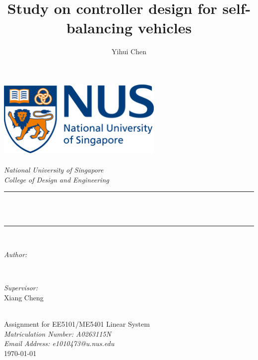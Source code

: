 \documentclass[hyperref]{article}
\title{Study on controller design for self-balancing vehicles}
\author{\textup{Yihui Chen}}
\theoremstyle{nonumberplain}
\begin{document}
	\begin{titlepage}
		\center
		\newcommand{\HRule}{\rule{\linewidth}{0.5mm}}
		\includegraphics[width=8cm]{logo.png}\\[1cm] 
		\quad\\[1.5cm]
		\textsl{\Large National University of Singapore}\\[0.5cm] 
		\textsl{\large College of Design and Engineering}\\[0.5cm]
		\makeatletter
		\HRule \\[0.4cm]
		{ \huge \bfseries \@title}\\[0.4cm] 
		\HRule \\[1.5cm]
		\begin{minipage}{0.4\textwidth}
			\begin{flushleft} \large
				\emph{Author:}\\
				\@author 
			\end{flushleft}
		\end{minipage}
		~
		\begin{minipage}{0.4\textwidth}
			\begin{flushright} \large
				\emph{Supervisor:} \\
				\textup{Xiang Cheng}
			\end{flushright}
		\end{minipage}\\[3cm]
		\makeatother
		{\Large Assignment for EE5101/ME5401 Linear System}\\[0.5cm]
		{\large \emph{Matriculation Number: A0263115N}}\\[0.5cm]
		{\large \emph{Email Address: e1010473@u.nus.edu}}\\[0.5cm]
		{\large \today}\\[2cm] 
		\vfill 
	\end{titlepage}
	
\end{document}
